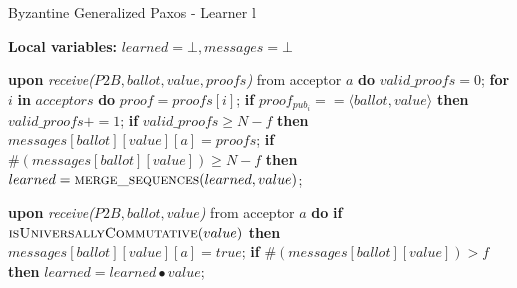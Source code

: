 \begin{algorithm}
	\caption{Byzantine Generalized Paxos - Learner l}
	\label{BFT-Learn}
	\textbf{Local variables:} $learned = \bot, messages = \bot$
	\begin{algorithmic}[1]			
		\State \textbf{upon} \textit{receive($P2B, ballot, value, proofs$)} from acceptor $a$ \textbf{do}
		\State \hspace{\algorithmicindent} $valid\_proofs = 0$;
		\State \hspace{\algorithmicindent} \textbf{for} $i$ \textbf{in} $acceptors$ \textbf{do}
		\State \hspace{\algorithmicindent}\hspace{\algorithmicindent} $proof = proofs[i]$;
		\State \hspace{\algorithmicindent}\hspace{\algorithmicindent} \textbf{if} $proof_{pub_i} == \langle ballot, value \rangle$ \textbf{then}
		\State \hspace{\algorithmicindent}\hspace{\algorithmicindent}\hspace{\algorithmicindent} 
		$valid\_proofs \mathrel{+{=}} 1$;
		\State
		\State \hspace{\algorithmicindent} \textbf{if} $valid\_proofs \geq N-f$ \textbf{then}
		\State \hspace{\algorithmicindent}\hspace{\algorithmicindent} $messages[ballot][value][a] = proofs$;
		\State
		\State \hspace{\algorithmicindent}\hspace{\algorithmicindent} \textbf{if} $\#(messages[ballot][value]) \geq N-f$ \textbf{then}
		\State \hspace{\algorithmicindent}\hspace{\algorithmicindent}\hspace{\algorithmicindent} $learned = \Call{merge\_sequences}{learned, value}$;

		\State
		\State \textbf{upon} \textit{receive($P2B, ballot, value$)} from acceptor $a$ \textbf{do}
		\State \hspace{\algorithmicindent} \textbf{if} $\Call{isUniversallyCommutative}{value}$ \textbf{then}
		\State \hspace{\algorithmicindent}\hspace{\algorithmicindent}
		 $messages[ballot][value][a] = true$;
		\State \hspace{\algorithmicindent}\hspace{\algorithmicindent} \textbf{if} $\#(messages[ballot][value]) > f$ \textbf{then} 
		\State \hspace{\algorithmicindent}\hspace{\algorithmicindent}\hspace{\algorithmicindent} $learned = learned \bullet value$;
		

\end{algorithmic}
\end{algorithm}
